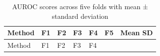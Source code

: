 \documentclass{article}
\begin{document}
\begin{longtable}[]{@{}
  >{\raggedright\arraybackslash}p{}
  >{\raggedleft\arraybackslash}p{}
  >{\raggedleft\arraybackslash}p{}
  >{\raggedleft\arraybackslash}p{}
  >{\raggedleft\arraybackslash}p{}
  >{\raggedleft\arraybackslash}p{}
  >{\raggedright\arraybackslash}p{}@{}}
\caption{AUROC scores across five folds with mean ± standard
deviation}\tabularnewline
\toprule\noalign{}
\begin{minipage}[b]{\linewidth}\raggedright
Method
\end{minipage} & \begin{minipage}[b]{\linewidth}\raggedleft
F1
\end{minipage} & \begin{minipage}[b]{\linewidth}\raggedleft
F2
\end{minipage} & \begin{minipage}[b]{\linewidth}\raggedleft
F3
\end{minipage} & \begin{minipage}[b]{\linewidth}\raggedleft
F4
\end{minipage} & \begin{minipage}[b]{\linewidth}\raggedleft
F5
\end{minipage} & \begin{minipage}[b]{\linewidth}\raggedright
Mean SD
\end{minipage} \\
\midrule\noalign{}
\endfirsthead
\toprule\noalign{}
\begin{minipage}[b]{\linewidth}\raggedright
Method
\end{minipage} & \begin{minipage}[b]{\linewidth}\raggedleft
F1
\end{minipage} & \begin{minipage}[b]{\linewidth}\raggedleft
F2
\end{minipage} & \begin{minipage}[b]{\linewidth}\raggedleft
F3
\end{minipage} & \begin{minipage}[b]{\linewidth}\raggedleft
F4
\end{minipage} & \begin{minipage}[b]{\linewidth}\raggedleft

\end{minipage}
\end{longtable}
\end{document}
